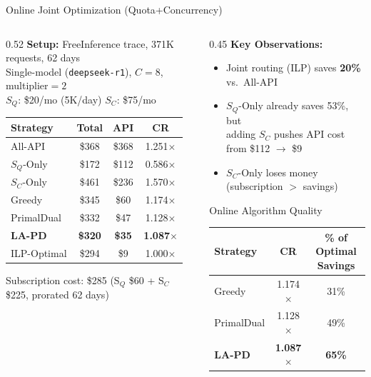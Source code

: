 \documentclass[aspectratio=169,10pt]{beamer}
\begin{document}
\begin{frame}{Online Joint Optimization (Quota+Concurrency)}
\begin{columns}[T]
\begin{column}{0.52\textwidth}
\small
\textbf{Setup:} FreeInference trace, 371K requests, 62 days\\
Single-model (\texttt{deepseek-r1}), $C=8$, multiplier$=2$\\
$S_Q$: \$20/mo (5K/day) \quad $S_C$: \$75/mo

\vspace{0.2cm}
\footnotesize
\centering
\begin{tabular}{lccc}
\toprule
Strategy & Total & API & CR \\
\midrule
All-API & \$368 & \$368 & 1.251$\times$ \\
$S_Q$-Only & \$172 & \$112 & 0.586$\times$ \\
$S_C$-Only & \$461 & \$236 & 1.570$\times$ \\
\midrule
Greedy & \$345 & \$60 & 1.174$\times$ \\
PrimalDual & \$332 & \$47 & 1.128$\times$ \\
\textbf{LA-PD} & \textbf{\$320} & \textbf{\$35} & \textbf{1.087$\times$} \\
\midrule
ILP-Optimal & \$294 & \$9 & 1.000$\times$ \\
\bottomrule
\end{tabular}

\vspace{0.1cm}
\scriptsize Subscription cost: \$285 (S$_Q$ \$60 + S$_C$ \$225, prorated 62 days)
\end{column}

\begin{column}{0.45\textwidth}
\small
\textbf{Key Observations:}
\begin{itemize}\setlength{\itemsep}{2pt}
    \item Joint routing (ILP) saves \textbf{20\%} vs.\ All-API
    \item $S_Q$-Only already saves 53\%, but\\adding $S_C$ pushes API cost from \$112 $\to$ \$9
    \item $S_C$-Only loses money (subscription $>$ savings)
\end{itemize}

\vspace{0.15cm}
\begin{exampleblock}{\small Online Algorithm Quality}
\scriptsize
\begin{tabular}{lcc}
Strategy & CR & \% of Optimal Savings \\
\midrule
Greedy & 1.174$\times$ & 31\% \\
PrimalDual & 1.128$\times$ & 49\% \\
\textbf{LA-PD} & \textbf{1.087$\times$} & \textbf{65\%} \\
\end{tabular}


\end{exampleblock}
\end{column}
\end{columns}
\end{frame}
\end{document}
